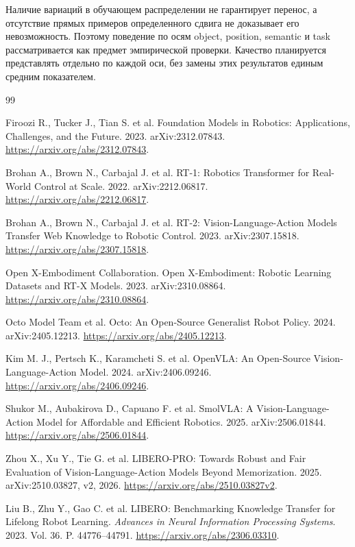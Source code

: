 \documentclass{misisarticle}
\begin{document}
Наличие вариаций в обучающем распределении не гарантирует перенос, а отсутствие прямых примеров определенного сдвига не доказывает его невозможность. Поэтому поведение по осям object, position, semantic и task рассматривается как предмет эмпирической проверки. Качество планируется представлять отдельно по каждой оси, без замены этих результатов единым средним показателем.

\begin{thebibliography}{99}

Firoozi R., Tucker J., Tian S. et al. Foundation Models in Robotics: Applications, Challenges, and the Future. 2023. arXiv:2312.07843. \url{https://arxiv.org/abs/2312.07843}.

Brohan A., Brown N., Carbajal J. et al. RT-1: Robotics Transformer for Real-World Control at Scale. 2022. arXiv:2212.06817. \url{https://arxiv.org/abs/2212.06817}.

Brohan A., Brown N., Carbajal J. et al. RT-2: Vision-Language-Action Models Transfer Web Knowledge to Robotic Control. 2023. arXiv:2307.15818. \url{https://arxiv.org/abs/2307.15818}.

Open X-Embodiment Collaboration. Open X-Embodiment: Robotic Learning Datasets and RT-X Models. 2023. arXiv:2310.08864. \url{https://arxiv.org/abs/2310.08864}.

Octo Model Team et al. Octo: An Open-Source Generalist Robot Policy. 2024. arXiv:2405.12213. \url{https://arxiv.org/abs/2405.12213}.

Kim M. J., Pertsch K., Karamcheti S. et al. OpenVLA: An Open-Source Vision-Language-Action Model. 2024. arXiv:2406.09246. \url{https://arxiv.org/abs/2406.09246}.

Shukor M., Aubakirova D., Capuano F. et al. SmolVLA: A Vision-Language-Action Model for Affordable and Efficient Robotics. 2025. arXiv:2506.01844. \url{https://arxiv.org/abs/2506.01844}.

Zhou X., Xu Y., Tie G. et al. LIBERO-PRO: Towards Robust and Fair Evaluation of Vision-Language-Action Models Beyond Memorization. 2025. arXiv:2510.03827, v2, 2026. \url{https://arxiv.org/abs/2510.03827v2}.

Liu B., Zhu Y., Gao C. et al. LIBERO: Benchmarking Knowledge Transfer for Lifelong Robot Learning. \textit{Advances in Neural Information Processing Systems}. 2023. Vol. 36. P. 44776--44791. \url{https://arxiv.org/abs/2306.03310}.


\end{thebibliography}
\end{document}
